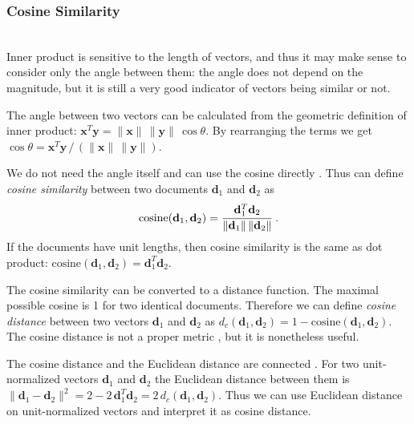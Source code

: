 \subsubsection{Cosine Similarity} \label{sec:cosine} \ \\




Inner product is sensitive to the length of vectors, and thus
it may make sense to consider only the angle between them:
the angle does not depend on the magnitude, but it is still
a very good indicator of vectors being similar or not.

The angle between two vectors can be calculated from the geometric
definition of inner product:
$\mathbf x^T \mathbf y = \|\mathbf x \| \, \| \mathbf y \| \, \cos \theta$.
By rearranging the terms we get
$\cos \theta = \mathbf x^T \mathbf y \, / \, (\|\mathbf x \| \, \| \mathbf y \|)$.

We do not need the angle itself and can use the cosine directly
\cite{manning2008introduction}.
Thus can define \emph{cosine similarity} between two documents $\mathbf d_1$ and
$\mathbf d_2$ as
$$\text{cosine}(\mathbf d_1, \mathbf d_2) = \cfrac{\mathbf d_1^T \mathbf d_2}{\|\mathbf d_1 \| \, \| \mathbf d_2 \|} \ .$$
If the documents have unit lengths, then cosine similarity is the same as
dot product: $\text{cosine}(\mathbf d_1, \mathbf d_2) = \mathbf d_1^T \mathbf d_2$.

The cosine similarity can be converted to a distance function.
The maximal possible cosine is 1 for two identical documents.
Therefore we can define \emph{cosine distance} between two vectors
$\mathbf d_1$ and $\mathbf d_2$ as
$d_c(\mathbf d_1, \mathbf d_2) = 1 - \text{cosine}(\mathbf d_1, \mathbf d_2)$.
The cosine distance is not a proper metric \cite{korenius2007principal},
but it is nonetheless useful.

The cosine distance and the Euclidean distance are connected \cite{korenius2007principal}.
For two unit-normalized vectors $\mathbf d_1$ and $\mathbf d_2$ the Euclidean distance
between them is $\| \mathbf d_1 - \mathbf d_2 \|^2 = 2 - 2 \, \mathbf d_1^T \mathbf d_2 =2 \, d_c(\mathbf d_1, \mathbf d_2)$. Thus we can use Euclidean distance on
unit-normalized vectors and interpret it as cosine distance.


